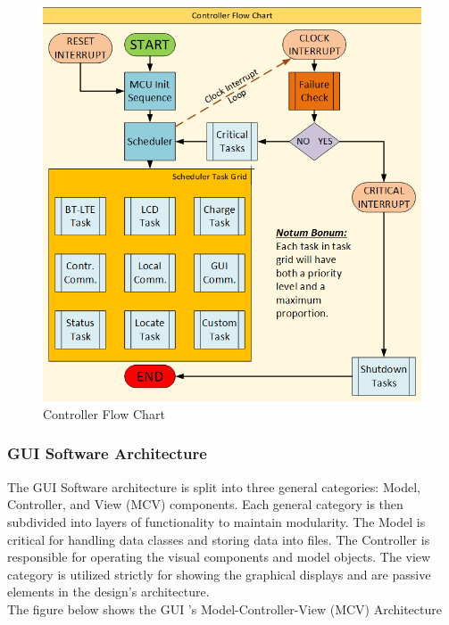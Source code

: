 \documentclass[12pt]{article}
\begin{document}
\begin{figure}[h!]
\centering
\includegraphics[width=0.88\linewidth]{mcu_workflow}
\caption{Controller Flow Chart}
\end{figure}

\hfill

\subsubsection{GUI Software Architecture} The GUI Software architecture is split into three general categories: Model, Controller, and View (MCV) components.  Each general category is then subdivided into layers of functionality to maintain modularity.  The Model is critical for handling data classes and storing data into files.  The Controller is responsible for operating the visual components and model objects.  The view category is utilized strictly for showing the graphical displays and are passive elements in the design’s architecture.\\

\indent
The figure below shows the GUI 's Model-Controller-View (MCV) Architecture
\hfill
\end{document}
